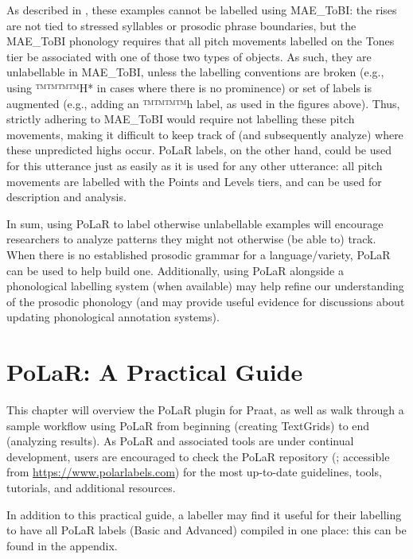 \documentclass[11pt, twoside]{memoir}
\begin{document}
As described in \citealt{ahnzhou19}, these examples cannot be labelled using MAE\_ToBI: the rises are not tied to stressed syllables or prosodic phrase boundaries, but the MAE\_ToBI phonology requires that all pitch movements labelled on the Tones tier be associated with one of those two types of objects. As such, they are unlabellable in MAE\_ToBI, unless the labelling conventions are broken (e.g., using ™™™™{H*} in cases where there is no prominence) or set of labels is augmented (e.g., adding an ™™™™{h} label, as used in the figures above). Thus, strictly adhering to MAE\_ToBI would require not labelling these pitch movements, making it difficult to keep track of (and subsequently analyze) where these unpredicted highs occur. PoLaR labels, on the other hand, could be used for this utterance just as easily as it is used for any other utterance: all pitch movements are labelled with the Points and Levels tiers, and can be used for description and analysis.

In sum, using PoLaR to label otherwise unlabellable examples will encourage researchers to analyze patterns they might not otherwise (be able to) track. When there is no established prosodic grammar for a language\slash variety, PoLaR can be used to help build one. Additionally, using PoLaR alongside a phonological labelling system (when available) may help refine our understanding of the prosodic phonology (and may provide useful evidence for discussions about updating phonological annotation systems).







\chapter{PoLaR: A Practical Guide}\label{ch:practical}

This chapter will overview the PoLaR plugin for Praat, as well as walk through a sample workflow using PoLaR from beginning (creating TextGrids) to end (analyzing results). As PoLaR and associated tools are under continual development, users are encouraged to check the PoLaR repository (\citealt{ahn-21}; accessible from \href{https://www.polarlabels.com}{https://www.polarlabels.com}) for the most up-to-date guidelines, tools, tutorials, and additional resources.

In addition to this practical guide, a labeller may find it useful for their labelling to have all PoLaR labels (Basic and Advanced) compiled in one place: this can be found in the appendix.
\end{document}
